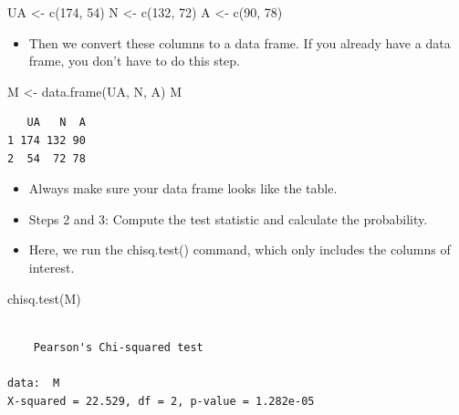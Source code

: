 \documentclass[
  letterpaper,
  DIV=11,
  numbers=noendperiod]{scrreprt}
\newenvironment{Shaded}{\begin{snugshade}}{\end{snugshade}}
\newcommand{\DecValTok}[1]{\textcolor[rgb]{0.68,0.00,0.00}{#1}}
\newcommand{\FunctionTok}[1]{\textcolor[rgb]{0.28,0.35,0.67}{#1}}
\newcommand{\NormalTok}[1]{\textcolor[rgb]{0.00,0.23,0.31}{#1}}
\newcommand{\OtherTok}[1]{\textcolor[rgb]{0.00,0.23,0.31}{#1}}
\providecommand{\tightlist}{%
  \setlength{\itemsep}{0pt}\setlength{\parskip}{0pt}}\usepackage{longtable,booktabs,array}
\begin{document}
\begin{Shaded}
\begin{Highlighting}[]
\NormalTok{UA }\OtherTok{\textless{}{-}} \FunctionTok{c}\NormalTok{(}\DecValTok{174}\NormalTok{, }\DecValTok{54}\NormalTok{)}
\NormalTok{N }\OtherTok{\textless{}{-}} \FunctionTok{c}\NormalTok{(}\DecValTok{132}\NormalTok{, }\DecValTok{72}\NormalTok{)}
\NormalTok{A }\OtherTok{\textless{}{-}} \FunctionTok{c}\NormalTok{(}\DecValTok{90}\NormalTok{, }\DecValTok{78}\NormalTok{)}
\end{Highlighting}
\end{Shaded}

\begin{itemize}
\tightlist
\item
  Then we convert these columns to a data frame. If you already have a
  data frame, you don't have to do this step.
\end{itemize}

\begin{Shaded}
\begin{Highlighting}[]
\NormalTok{M }\OtherTok{\textless{}{-}} \FunctionTok{data.frame}\NormalTok{(UA, N, A)}
\NormalTok{M}
\end{Highlighting}
\end{Shaded}

\begin{verbatim}
   UA   N  A
1 174 132 90
2  54  72 78
\end{verbatim}

\begin{itemize}
\item
  Always make sure your data frame looks like the table.
\item
  Steps 2 and 3: Compute the test statistic and calculate the
  probability.
\item
  Here, we run the chisq.test() command, which only includes the columns
  of interest.
\end{itemize}

\begin{Shaded}
\begin{Highlighting}[]
\FunctionTok{chisq.test}\NormalTok{(M)}
\end{Highlighting}
\end{Shaded}

\begin{verbatim}

    Pearson's Chi-squared test

data:  M
X-squared = 22.529, df = 2, p-value = 1.282e-05
\end{verbatim}
\end{document}
